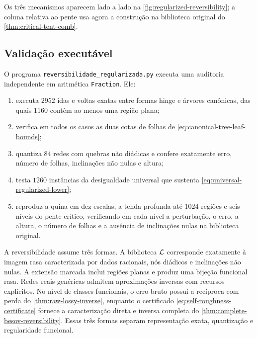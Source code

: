 Os três mecanismos aparecem lado a lado na
\cref{fig:regularized-reversibility}; a coluna relativa ao pente usa agora a
construção na biblioteca original do \cref{thm:critical-tent-comb}.

\subsection{Validação executável}

O programa \texttt{reversibilidade\_regularizada.py} executa uma auditoria
independente em aritmética \texttt{Fraction}. Ele:
\begin{enumerate}[label=(\roman*),leftmargin=2.2em]
 \item executa $2952$ idas e voltas exatas entre formas hinge e árvores
 canônicas, das quais $1160$ contêm ao menos uma região plana;
 \item verifica em todos os casos as duas cotas de folhas de
 \eqref{eq:canonical-tree-leaf-bounds};
 \item quantiza $84$ redes com quebras não diádicas e confere exatamente erro,
 número de folhas, inclinações não nulas e altura;
 \item testa $1260$ instâncias da desigualdade universal que sustenta
 \eqref{eq:universal-regularized-lower};
 \item reproduz a quina em dez escalas, a tenda profunda até $1024$ regiões e
 seis níveis do pente crítico, verificando em cada nível a perturbação, o erro,
 a altura, o número de folhas e a ausência de inclinações nulas na biblioteca
 original.
\end{enumerate}

A reversibilidade assume três formas. A biblioteca $\mathcal{L}$ corresponde
exatamente à imagem rasa caracterizada por dados racionais, nós diádicos e
inclinações não nulas. A extensão marcada inclui regiões planas e produz uma
bijeção funcional rasa. Redes reais genéricas admitem aproximações inversas
com recursos explícitos. No nível de classes funcionais, o erro bruto possui a recíproca com perda do
\cref{thm:raw-lossy-inverse}, enquanto o certificado
\eqref{eq:self-roughness-certificate} fornece a caracterização direta e
inversa completa do \cref{thm:complete-besov-reversibility}. Essas três formas
separam representação exata, quantização e regularidade funcional.
